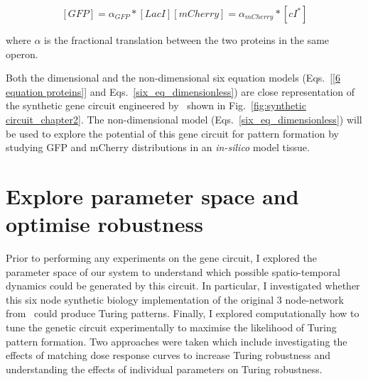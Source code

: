 \begin{subequations}
    \begin{equation}
        [GFP] = \alpha_{GFP}*[LacI]
    \end{equation}
    \begin{equation}
        [mCherry] = \alpha_{mCherry}*[cI^*]
    \end{equation}
    \label{linear_fluorescence}
\end{subequations}

where $\alpha$ is the fractional translation between the two proteins in the same operon.


Both the dimensional and the non-dimensional six equation models
(Eqs.~\ref{[6 equation proteins]} and Eqs.~\ref{six_eq_dimensionless})
are close representation of the synthetic gene circuit engineered
by~\cite{Tica2020} shown in Fig.~\ref{fig:synthetic circuit_chapter2}.
The non-dimensional model (Eqs.~\ref{six_eq_dimensionless})
will be used to explore the potential of this gene circuit for pattern formation by studying GFP and mCherry distributions in an \textit{in-silico} model tissue.



\section{Explore parameter space and optimise robustness}
Prior to performing any experiments on the gene circuit,
I explored the parameter space of our system
to understand which possible spatio-temporal dynamics could be generated by this circuit.
In particular,
I investigated
whether this six node synthetic biology implementation of the original 3 node-network from~\cite{Scholes2019} could produce Turing patterns.
Finally,
I explored computationally
how to tune the genetic circuit experimentally to maximise the likelihood of Turing pattern formation.
Two approaches were taken
which include
investigating the effects of matching dose response curves to increase Turing robustness
and understanding the effects of individual parameters on Turing robustness.

